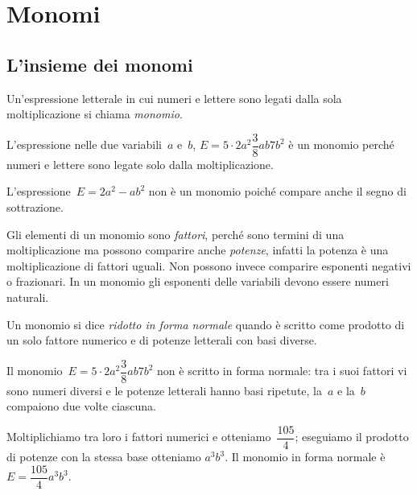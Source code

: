 \chapter{Monomi}
\section{L'insieme dei monomi}

\begin{definizione}
Un'espressione letterale in cui numeri e lettere sono legati dalla sola moltiplicazione si chiama \emph{monomio}.
\end{definizione}

\begin{exrig}
 \begin{esempio}
L'espressione nelle due variabili~$a$ e~$b$, $E=5\cdot 2a^{2}\dfrac{3}{8}ab7b^{2}$
è un monomio perché numeri e lettere sono legate solo dalla moltiplicazione.
 \end{esempio}

 \begin{esempio}
L'espressione~$E=2a^{2}-ab^{2}$ non è un monomio poiché compare anche il segno di sottrazione.
 \end{esempio}
\end{exrig}

\ovalbox{\risolvi \ref{ese:9.1}}

\osservazione
Gli elementi di un monomio sono \emph{fattori}, perché sono termini
di una moltiplicazione ma possono comparire anche \emph{potenze},
infatti la potenza è una moltiplicazione di fattori uguali. Non
possono invece comparire esponenti negativi o frazionari. In un monomio
gli esponenti delle variabili devono essere numeri naturali.

\begin{definizione}
Un monomio si dice \emph{ridotto in forma normale} quando è scritto come prodotto di un solo fattore
numerico e di potenze letterali con basi diverse.
\end{definizione}

\begin{exrig}
 \begin{esempio}
Il monomio~$E=5\cdot 2a^{2}\dfrac{3}{8}ab7b^{2}$ non è scritto in
forma normale: tra i suoi fattori vi sono numeri diversi e le potenze
letterali hanno basi ripetute, la~$a$ e la~$b$ compaiono due volte ciascuna.

Moltiplichiamo tra loro i fattori numerici e otteniamo~$\dfrac{105}{4}$; eseguiamo il prodotto di potenze con la stessa base otteniamo
$a^{3}b^{3}$. Il monomio in forma normale è~$E=\dfrac{105}{4}a^{3}b^{3}$.
 \end{esempio}
\end{exrig}

